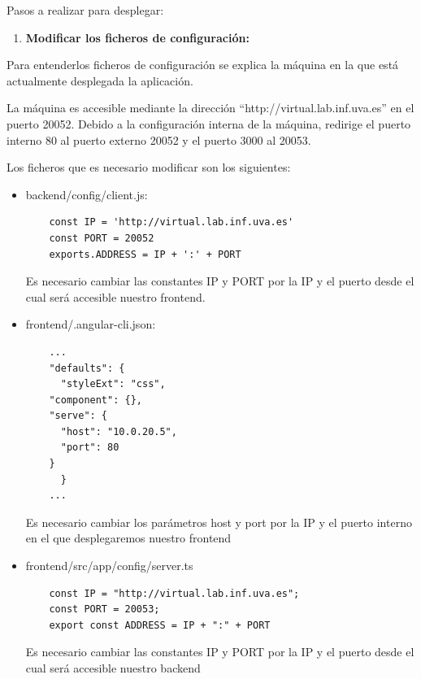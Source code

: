 \documentclass[openright,twoside,10pt]{book}
\providecommand{\tightlist}{%
  \setlength{\itemsep}{0pt}\setlength{\parskip}{0pt}}
\begin{document}
    Pasos a realizar para desplegar:
    
    \begin{enumerate}
    \def\labelenumi{\arabic{enumi}.}
    \tightlist
    \item
      \textbf{Modificar los ficheros de configuración:}
    \end{enumerate}
    
    Para entenderlos ficheros de configuración se explica la máquina en la
    que está actualmente desplegada la aplicación.
    
    La máquina es accesible mediante la dirección
    \enquote{http://virtual.lab.inf.uva.es} en el puerto 20052. Debido a la
    configuración interna de la máquina, redirige el puerto interno 80 al
    puerto externo 20052 y el puerto 3000 al 20053.
    
    Los ficheros que es necesario modificar son los siguientes:
    
    \begin{itemize}
    \item
      backend/config/client.js:
    
    \begin{verbatim}
    const IP = 'http://virtual.lab.inf.uva.es'
    const PORT = 20052 
    exports.ADDRESS = IP + ':' + PORT
    \end{verbatim}
    
      Es necesario cambiar las constantes IP y PORT por la IP y el puerto
      desde el cual será accesible nuestro frontend.
    \item
      frontend/.angular-cli.json:
    
    \begin{verbatim}
    ...
    "defaults": {
      "styleExt": "css",
    "component": {},
    "serve": {
      "host": "10.0.20.5",
      "port": 80
    }
      }
    ...
    \end{verbatim}
    
      Es necesario cambiar los parámetros host y port por la IP y el puerto
      interno en el que desplegaremos nuestro frontend
    \item
      frontend/src/app/config/server.ts
    
    \begin{verbatim}
    const IP = "http://virtual.lab.inf.uva.es";
    const PORT = 20053;
    export const ADDRESS = IP + ":" + PORT
    \end{verbatim}
    
      Es necesario cambiar las constantes IP y PORT por la IP y el puerto
      desde el cual será accesible nuestro backend
    \end{itemize}
    
\end{document}
